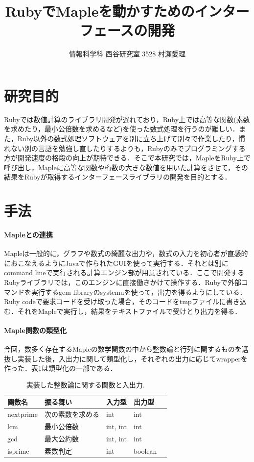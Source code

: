 \documentclass[10pt,a4j,twocolumn]{jsarticle}
\begin{document}
\title{RubyでMapleを動かすためのインターフェースの開発}
\author{情報科学科 西谷研究室 3528 村瀬愛理}
\date{}
\maketitle
\section{研究目的}
\vspace{-0.5em}
Rubyでは数値計算のライブラリ開発が遅れており，Ruby上では高等な関数(素数を求めたり，最小公倍数を求めるなど)を使った数式処理を行うのが難しい．また，Ruby以外の数式処理ソフトウェアを別に立ち上げて別々で作業したり，慣れない別の言語を勉強し直したりするよりも，Rubyのみでプログラミングする方が開発速度の格段の向上が期待できる．そこで本研究では，MapleをRuby上で呼び出し，Mapleに高等な関数や桁数の大きな数値を用いた計算をさせて，その結果をRubyが取得するインターフェースライブラリの開発を目的とする．

\section{手法}
\vspace{-0.5em}
\paragraph{Mapleとの連携}
Mapleは一般的に，グラフや数式の綺麗な出力や，数式の入力を初心者が直感的におこなえるようにJavaで作られたGUIを使って実行する．それとは別にcommand lineで実行される計算エンジン部が用意されている．ここで開発するRubyライブラリでは，このエンジンに直接働きかけて操作する．Rubyで外部コマンドを実行するgem libraryのsystemuを使って，出力を得るようにしている．Ruby codeで要求コードを受け取った場合，そのコードをtmpファイルに書き込む．それをMapleで実行し，結果をテキストファイルで受けとり出力を得る．

\paragraph{Maple関数の類型化}
今回，数多く存在するMapleの数学関数の中から整数論と行列に関するものを選抜し実装した後，入出力に関して類型化し，それぞれの出力に応じてwrapperを作った．表1は類型化の一部である．
\begin{table}[htbp]\begin{center}
\caption{実装した整数論に関する関数と入出力.}
\label{table:one}
\begin{tabular}{lllll}
\hline
関数名  &振る舞い  &入力型  &出力型  \\ \hline
nextprime  &次の素数を求める  &int  &int  \\
lcm  &最小公倍数  &int, int  &int  \\
gcd  &最大公約数  &int, int  &int  \\
isprime  &素数判定  &int  &boolean  \\
\hline
\end{tabular}
\label{default}
\end{center}
\vspace{-2em}
\end{table}
\end{document}
